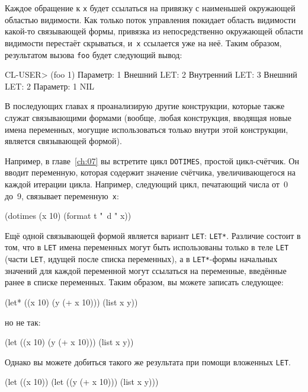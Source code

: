 Каждое обращение к \lstinline{x} будет ссылаться на привязку с наименьшей окружающей областью
видимости. Как только поток управления покидает область видимости какой-то связывающей
формы, привязка из непосредственно окружающей области видимости перестаёт скрываться,
и~\lstinline{x} ссылается уже на неё. Таким образом, результатом вызова \lstinline{foo} будет
следующий вывод:

\begin{myverb}
CL-USER> (foo 1)
Параметр: 1
Внешний LET: 2
Внутренний LET: 3
Внешний LET: 2
Параметр: 1
NIL
\end{myverb}

В последующих главах я проанализирую другие конструкции, которые также служат связывающими
формами (вообще, любая конструкция, вводящая новые имена переменных, могущие
использоваться только внутри этой конструкции, является связывающей формой).

Например, в главе~\ref{ch:07} вы встретите цикл \lstinline{DOTIMES}, простой цикл-счётчик. Он
вводит переменную, которая содержит значение счётчика, увеличивающегося на каждой итерации
цикла. Например, следующий цикл, печатающий числа от~0 до~9, связывает переменную~\lstinline{x}:

\begin{myverb}
(dotimes (x 10) (format t "~d " x))
\end{myverb}

Ещё одной связывающей формой является вариант \lstinline{LET}: \lstinline{LET*}. Различие
состоит в том, что в \lstinline{LET} имена переменных могут быть использованы только в теле
\lstinline{LET} (части \lstinline{LET}, идущей после списка переменных), а в \lstinline{LET*}-формы
начальных значений для каждой переменной могут ссылаться на переменные, введённые ранее в
списке переменных. Таким образом, вы можете записать следующее:

\begin{myverb}
(let* ((x 10)
       (y (+ x 10)))
  (list x y))
\end{myverb}

\noindent{}но не так:

\begin{myverb}
(let ((x 10)
      (y (+ x 10)))
  (list x y))
\end{myverb}

Однако вы можете добиться такого же результата при помощи вложенных \lstinline{LET}.

\begin{myverb}
(let ((x 10))
  (let ((y (+ x 10)))
    (list x y)))
\end{myverb}

